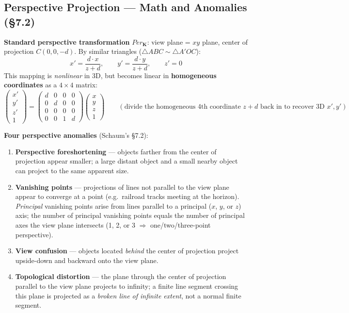 \documentclass[12pt, a4paper]{article}
\newenvironment{answerbox}{\begin{mdframed}[style=answerframe]}{\end{mdframed}}
\begin{document}
\subsection{Perspective Projection --- Math and Anomalies (\S7.2)}
\begin{answerbox}
\textbf{Standard perspective transformation} $Per_{\mathbf K}$: view plane = $xy$ plane, center of projection $C(0,0,-d)$. By similar triangles ($\triangle ABC \sim \triangle A'OC$):
$$x' = \frac{d\cdot x}{z+d}, \qquad y'=\frac{d\cdot y}{z+d}, \qquad z'=0$$
This mapping is \emph{nonlinear} in 3D, but becomes linear in \textbf{homogeneous coordinates} as a $4\times4$ matrix:
$$\begin{pmatrix}x'\\y'\\z'\\1\end{pmatrix} = \begin{pmatrix}d&0&0&0\\0&d&0&0\\0&0&0&0\\0&0&1&d\end{pmatrix}\begin{pmatrix}x\\y\\z\\1\end{pmatrix} \qquad (\text{divide the homogeneous 4th coordinate }z+d\text{ back in to recover 3D }x',y')$$

\textbf{Four perspective anomalies} (Schaum's \S7.2):
\begin{enumerate}[noitemsep]
  \item \textbf{Perspective foreshortening} --- objects farther from the center of projection appear smaller; a large distant object and a small nearby object can project to the same apparent size.
  \item \textbf{Vanishing points} --- projections of lines not parallel to the view plane appear to converge at a point (e.g.\ railroad tracks meeting at the horizon). \emph{Principal} vanishing points arise from lines parallel to a principal ($x$, $y$, or $z$) axis; the number of principal vanishing points equals the number of principal axes the view plane intersects (1, 2, or 3 $\Rightarrow$ one/two/three-point perspective).
  \item \textbf{View confusion} --- objects located \emph{behind} the center of projection project upside-down and backward onto the view plane.
  \item \textbf{Topological distortion} --- the plane through the center of projection parallel to the view plane projects to infinity; a finite line segment crossing this plane is projected as a \emph{broken line of infinite extent}, not a normal finite segment.
\end{enumerate}
\end{answerbox}
\end{document}
